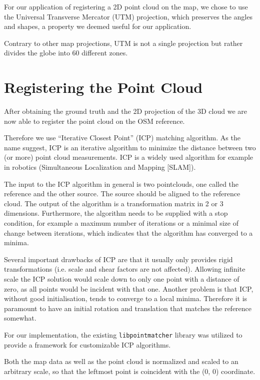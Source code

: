 \documentclass[10pt,twocolumn,letterpaper]{article}
\begin{document}
For our application of registering a 2D point cloud on the map, we chose to use the Universal Transverse Mercator (UTM) projection, which preserves the angles and shapes, a property we deemed useful for our application.

Contrary to other map projections, UTM is not a single projection but rather divides the globe into 60 different zones.

\section{Registering the Point Cloud}

After obtaining the ground truth and the 2D projection of the 3D cloud we are now able to register the point cloud on the OSM reference.

Therefore we use ``Iterative Closest Point'' (ICP) matching algorithm. As the name suggest, ICP is an iterative algorithm to minimize the distance between two (or more) point cloud measurements. ICP is a widely used algorithm for example in robotics (Simultaneous Localization and Mapping [SLAM]). 

The input to the ICP algorithm in general is two pointclouds, one called the reference and the other source. The source should be aligned to the reference cloud. The output of the algorithm is a transformation matrix in 2 or 3 dimensions. Furthermore, the algorithm needs to be supplied with a stop condition, for example a maximum number of iterations or a minimal size of change between iterations, which indicates that the algorithm has converged to a minima.

Several important drawbacks of ICP are that it usually only provides rigid transformations (i.e. scale and shear factors are not affected). Allowing infinite scale the ICP solution would scale down to only one point with a distance of zero, as all points would be incident with that one. Another problem is that ICP, without good initialisation, tends to converge to a local minima. Therefore it is paramount to have an initial rotation and translation that matches the reference somewhat. %

For our implementation, the existing \texttt{libpointmatcher}\cite{Pomerleau12comp} library was utilized to provide a framework for customizable ICP algorithms.

Both the map data as well as the point cloud is normalized and scaled to an arbitrary scale, so that the leftmost point is coincident with the (0, 0) coordinate.
\end{document}
